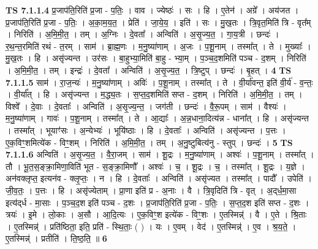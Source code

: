 \documentclass[17pt]{extarticle}
\begin{document}
                  \newline
                                \textbf{ TS 7.1.1.4} \newline
                  प्र॒जाप॑ति॒रिति॑ प्र॒जा - प॒तिः॒ । वाव । ज्येष्ठः॑ । सः । हि । ए॒तेन॑ । अग्रे᳚ । अय॑जत । प्र॒जाप॑ति॒रिति॑ प्र॒जा - प॒तिः॒ । अ॒का॒म॒य॒त॒ । प्रेति॑ । जा॒ये॒य॒ । इति॑ । सः । मु॒ख॒तः । त्रि॒वृत॒मिति॑ त्रि - वृत᳚म् । निरिति॑ । अ॒मि॒मी॒त॒ । तम् । अ॒ग्निः । दे॒वता᳚ । अन्विति॑ । अ॒सृ॒ज्य॒त॒ । गा॒य॒त्री । छन्दः॑ । र॒थ॒न्त॒रमिति॑ रथं - त॒रम् । साम॑ । ब्रा॒ह्म॒णः । म॒नु॒ष्या॑णाम् । अ॒जः । प॒शू॒नाम् । तस्मा᳚त् । ते । मुख्याः᳚ । मु॒ख॒तः । हि । असृ॑ज्यन्त । उर॑सः । बा॒हुभ्या॒मिति॑ बा॒हु - भ्या॒म् । प॒ञ्च॒द॒शमिति॑ पञ्च - द॒शम् । निरिति॑ । अ॒मि॒मी॒त॒ । तम् । इन्द्रः॑ । दे॒वता᳚ । अन्विति॑ । अ॒सृ॒ज्य॒त॒ । त्रि॒ष्टुप् । छन्दः॑ । बृ॒हत् । \textbf{  4} \newline
                  \newline
                                \textbf{ TS 7.1.1.5} \newline
                  साम॑ । रा॒ज॒न्यः॑ । म॒नु॒ष्या॑णाम् । अविः॑ । प॒शू॒नाम् । तस्मा᳚त् । ते । वी॒र्या॑वन्त॒ इति॑ वी॒र्य॑ - व॒न्तः॒ । वी॒र्या᳚त् । हि । असृ॑ज्यन्त । म॒द्ध्य॒तः । स॒प्त॒द॒शमिति॑ सप्त - द॒शम् । निरिति॑ । अ॒मि॒मी॒त॒ । तम् । विश्वे᳚ । दे॒वाः । दे॒वताः᳚ । अन्विति॑ । अ॒सृ॒ज्य॒न्त॒ । जग॑ती । छन्दः॑ । वै॒रू॒पम् । साम॑ । वैश्यः॑ । म॒नु॒ष्या॑णाम् । गावः॑ । प॒शू॒नाम् । तस्मा᳚त् । ते । आ॒द्याः᳚ । अ॒न्न॒धाना॒दित्य॑न्न - धाना᳚त् । हि । असृ॑ज्यन्त । तस्मा᳚त् । भूयाꣳ॑सः । अ॒न्येभ्यः॑ । भूयि॑ष्ठाः । हि । दे॒वताः᳚ । अन्विति॑ । असृ॑ज्यन्त । प॒त्तः । ए॒क॒विꣳ॒॒शमित्ये॑क - विꣳ॒॒शम् । निरिति॑ । अ॒मि॒मी॒त॒ । तम् । अ॒नु॒ष्टुबित्य॑नु - स्तुप् । छन्दः॑ । \textbf{  5} \newline
                  \newline
                                \textbf{ TS 7.1.1.6} \newline
                  अन्विति॑ । अ॒सृ॒ज्य॒त॒ । वै॒रा॒जम् । साम॑ । शू॒द्रः । म॒नु॒ष्या॑णाम् । अश्वः॑ । प॒शू॒नाम् । तस्मा᳚त् । तौ । भू॒त॒स॒ङ्क्रा॒मिणा॒विति॑ भूत - स॒ङ्क्रा॒मिणौ᳚ । अश्वः॑ । च॒ । शू॒द्रः । च॒ । तस्मा᳚त् । शू॒द्रः । य॒ज्ञे । अन॑वक्लृप्त॒ इत्यन॑व - क्लृ॒प्तः॒ । न । हि । दे॒वताः᳚ । अन्विति॑ । असृ॑ज्यत । तस्मा᳚त् । पादौ᳚ । उपेति॑ । जी॒व॒तः॒ । प॒त्तः । हि । असृ॑ज्येताम् । प्रा॒णा इति॑ प्र - अ॒नाः । वै । त्रि॒वृदिति॑ त्रि - वृत् । अ॒द्‌र्ध॒मा॒सा इत्य॑द्‌र्ध - मा॒साः । प॒ञ्च॒द॒श इति॑ पञ्च - द॒शः । प्र॒जाप॑ति॒रिति॑ प्र॒जा - प॒तिः॒ । स॒प्त॒द॒श इति॑ सप्त - द॒शः । त्रयः॑ । इ॒मे । लो॒काः । अ॒सौ । आ॒दि॒त्यः । ए॒क॒विꣳ॒॒श इत्ये॑क - विꣳ॒॒शः । ए॒तस्मिन्न्॑ । वै । ए॒ते । श्रि॒ताः । ए॒तस्मिन्न्॑ । प्रति॑ष्ठिता॒ इति॒ प्रति॑ - स्थि॒ताः॒ ( ) । यः । ए॒वम् । वेद॑ । ए॒तस्मिन्न्॑ । ए॒व । श्र॒य॒ते॒ । ए॒तस्मिन्न्॑ । प्रतीति॑ । ति॒ष्ठ॒ति॒ ॥ \textbf{  6} \newline
\end{document}
